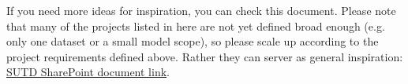 \documentclass[DIV12, oneside]{scrartcl}
\begin{document}
\noindent If you need more ideas for inspiration, you can check this document. Please note that many of the projects listed in here are not yet defined broad enough (e.g. only one dataset or a small model scope), so please scale up according to the project requirements defined above. Rather they can server as general inspiration: \href{https://sutdapac-my.sharepoint.com/:w:/g/personal/nizam_kadir_mymail_sutd_edu_sg/IQDqVRQ8h50eTbhBnC2s0MsYAeVfCqCX30We0Kmlw_gPxq0?e=z62Tif}{SUTD SharePoint document link}.
\end{document}
